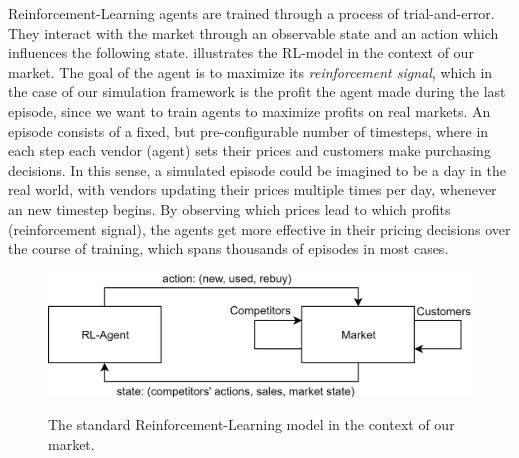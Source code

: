 Reinforcement-Learning agents are trained through a process of trial-and-error. They interact with the market through an observable state and an action which influences the following state.  illustrates the RL-model in the context of our market. The goal of the agent is to maximize its \emph{reinforcement signal}, which in the case of our simulation framework is the profit the agent made during the last episode, since we want to train agents to maximize profits on real markets. An episode consists of a fixed, but pre-configurable number of timesteps, where in each step each vendor (agent) sets their prices and customers make purchasing decisions. In this sense, a simulated episode could be imagined to be a day in the real world, with vendors updating their prices multiple times per day, whenever an new timestep begins. By observing which prices lead to which profits (reinforcement signal), the agents get more effective in their pricing decisions over the course of training, which spans thousands of episodes in most cases.

\begin{figure}[t]
	\centering
	\includegraphics[width = \textwidth]{images/RL_overview.png}\\
	\caption{The standard Reinforcement-Learning model in the context of our market.}\label{fig:IntroRLDiagram}
\end{figure}